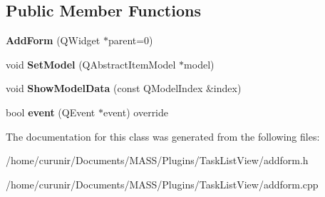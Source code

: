 \subsection*{Public Member Functions}
\begin{DoxyCompactItemize}
\item 
{\bfseries Add\+Form} (Q\+Widget $\ast$parent=0)\hypertarget{class_add_form_a623e493b6c6cb526d2a624010fe6efca}{}\label{class_add_form_a623e493b6c6cb526d2a624010fe6efca}

\item 
void {\bfseries Set\+Model} (Q\+Abstract\+Item\+Model $\ast$model)\hypertarget{class_add_form_a2edb1f6faa703e3f5129bb91907964d1}{}\label{class_add_form_a2edb1f6faa703e3f5129bb91907964d1}

\item 
void {\bfseries Show\+Model\+Data} (const Q\+Model\+Index \&index)\hypertarget{class_add_form_a8d77f148efbb818939d10821e6a3c6fd}{}\label{class_add_form_a8d77f148efbb818939d10821e6a3c6fd}

\item 
bool {\bfseries event} (Q\+Event $\ast$event) override\hypertarget{class_add_form_a488387f47577f8742c920e761e9e2c63}{}\label{class_add_form_a488387f47577f8742c920e761e9e2c63}

\end{DoxyCompactItemize}


The documentation for this class was generated from the following files\+:\begin{DoxyCompactItemize}
\item 
/home/curunir/\+Documents/\+M\+A\+S\+S/\+Plugins/\+Task\+List\+View/addform.\+h\item 
/home/curunir/\+Documents/\+M\+A\+S\+S/\+Plugins/\+Task\+List\+View/addform.\+cpp\end{DoxyCompactItemize}
